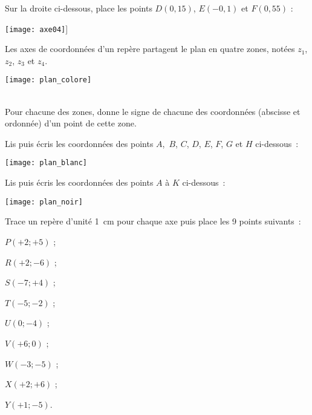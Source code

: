 \begin{exercice}
Sur la droite ci-dessous, place les points $D(0,15)$, $E(- 0,1)$ et $F(0,55)$ :
\begin{center} \texttt{[image: axe04]}] \end{center}
\end{exercice}

\vspace*{1em}

\begin{exercice}
\begin{minipage}[c]{0.3\linewidth}
Les axes de coordonnées d'un repère partagent le plan en quatre zones, notées $z_1$, $z_2$, $z_3$ et $z_4$.
 \end{minipage} \hfill%
 \begin{minipage}[c]{0.65\linewidth}
 \texttt{[image: plan\_colore]}
  \end{minipage} \\[1em]
Pour chacune des zones, donne le signe de chacune des coordonnées (abscisse et ordonnée) d'un point de cette zone.
\end{exercice}


\begin{exercice}
Lis puis écris les coordonnées des points $A$, $B$, $C$, $D$, $E$, $F$, $G$ et $H$ ci-dessous :
\begin{center} \texttt{[image: plan\_blanc]} \end{center}
\end{exercice}


\begin{exercice}
Lis puis écris les coordonnées des points $A$ à $K$ ci-dessous :
\begin{center} \texttt{[image: plan\_noir]} \end{center}
\end{exercice}


\begin{exercice}
Trace un repère d'unité 1 cm pour chaque axe puis place les 9 points suivants :
\begin{colitemize}{3}
 \item $P(+2 ; +5)$ ;
 \item $R(+2 ; -6)$ ;
 \item $S(-7 ; +4)$ ;
 \item $T(-5 ; -2)$ ;
 \item $U(0 ; -4)$ ;
 \item $V(+6 ; 0)$ ;
 \item $W(-3 ; -5)$ ;
 \item $X(+2 ; +6)$ ;
 \item $Y(+1 ; -5)$.
 \end{colitemize}
\end{exercice}


